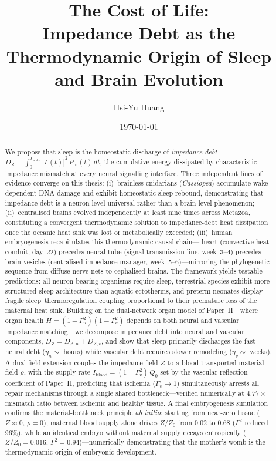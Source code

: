 ﻿\documentclass[aps,pre,twocolumn,superscriptaddress,floatfix]{revtex4-2}
\begin{document}
\title{The Cost of Life:\\
Impedance Debt as the Thermodynamic Origin of Sleep and Brain Evolution}

\author{Hsi-Yu Huang}

\date{\today}

\begin{abstract}
We propose that sleep is the homeostatic discharge of \emph{impedance debt}
$D_Z \equiv \int_0^{T_{\mathrm{wake}}} |\Gamma(t)|^2\, P_{\mathrm{in}}(t)\,dt$,
the cumulative energy dissipated by characteristic-impedance mismatch
at every neural signalling interface.
Three independent lines of evidence converge on this thesis:
(i)~brainless cnidarians (\textit{Cassiopea}) accumulate
wake-dependent DNA damage and exhibit homeostatic sleep rebound,
demonstrating that impedance debt is a neuron-level universal
rather than a brain-level phenomenon;
(ii)~centralised brains evolved independently at least nine times
across Metazoa, constituting a convergent thermodynamic solution
to impedance-debt heat dissipation once the oceanic heat sink
was lost or metabolically exceeded;
(iii)~human embryogenesis recapitulates this thermodynamic causal chain---
heart (convective heat conduit, day~22) precedes neural tube
(signal transmission line, week~3--4) precedes brain vesicles
(centralised impedance manager, week~5--6)---mirroring the
phylogenetic sequence from diffuse nerve nets to cephalised brains.
The framework yields testable predictions:
all neuron-bearing organisms require sleep,
terrestrial species exhibit more structured sleep architecture
than aquatic ectotherms,
and preterm neonates display fragile sleep--thermoregulation coupling
proportional to their premature loss of the maternal heat sink.
Building on the dual-network organ model of Paper~II---where
organ health $H = (1-\Gamma_n^2)(1-\Gamma_v^2)$ depends on
both neural and vascular impedance matching---we decompose
impedance debt into neural and vascular components,
$D_Z = D_{Z,n} + D_{Z,v}$, and show that sleep primarily
discharges the fast neural debt ($\eta_n \sim$ hours) while
vascular debt requires slower remodeling ($\eta_v \sim$ weeks).
A dual-field extension couples the impedance field $Z$ to a
blood-transported material field $\rho$, with the supply rate
$I_{\mathrm{blood}} = (1-\Gamma_v^2)\,Q_0$ set by the
vascular reflection coefficient of Paper~II,
predicting that ischemia ($\Gamma_v \to 1$) simultaneously
arrests all repair mechanisms through a single shared
bottleneck---verified numerically at $4.77\times$ mismatch
ratio between ischemic and healthy tissue.
A final embryogenesis simulation confirms the material-bottleneck
principle \emph{ab initio}: starting from near-zero tissue
($Z \approx 0$, $\rho = 0$), maternal blood supply alone
drives $Z/Z_0$ from $0.02$ to $0.68$ ($\Gamma^2$ reduced 96\%),
while an identical embryo without maternal supply decays
entropically ($Z/Z_0 = 0.016$, $\Gamma^2 = 0.94$)---numerically
demonstrating that the mother's womb is the thermodynamic
origin of embryonic development.
\end{abstract}
\end{document}
